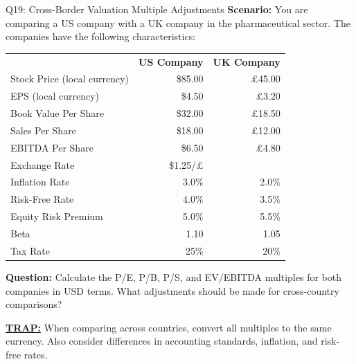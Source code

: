 \documentclass{beamer}
\renewcommand{\scriptsize}{\fontsize{6pt}{7pt}\selectfont}
\begin{document}
	\begin{frame}{Q19: Cross-Border Valuation Multiple Adjustments}
		\scriptsize
		\textbf{Scenario:} You are comparing a US company with a UK company in the pharmaceutical sector. The companies have the following characteristics:
		
		\begin{tabular}{lrr}
			& \textbf{US Company} & \textbf{UK Company} \\
			Stock Price (local currency) & \$85.00 & £45.00 \\
			EPS (local currency) & \$4.50 & £3.20 \\
			Book Value Per Share & \$32.00 & £18.50 \\
			Sales Per Share & \$18.00 & £12.00 \\
			EBITDA Per Share & \$6.50 & £4.80 \\
			Exchange Rate & \$1.25/£ & \\
			Inflation Rate & 3.0\% & 2.0\% \\
			Risk-Free Rate & 4.0\% & 3.5\% \\
			Equity Risk Premium & 5.0\% & 5.5\% \\
			Beta & 1.10 & 1.05 \\
			Tax Rate & 25\% & 20\% \\
		\end{tabular}
		
		\textbf{Question:} Calculate the P/E, P/B, P/S, and EV/EBITDA multiples for both companies in USD terms. What adjustments should be made for cross-country comparisons?
		
		\vspace{2pt}
		\underline{\textbf{TRAP:}} When comparing across countries, convert all multiples to the same currency. Also consider differences in accounting standards, inflation, and risk-free rates.
	\end{frame}
	
\end{document}
